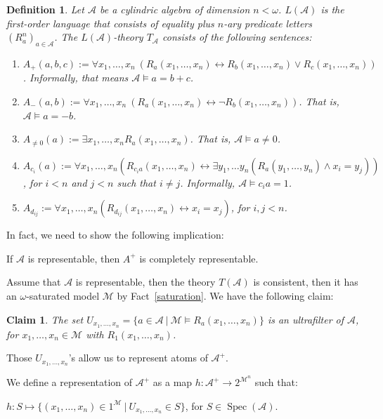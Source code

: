 \documentclass[a4paper]{article}
\theoremstyle{defin}
\newtheorem{defin}{Definition}
\theoremstyle{theorem}
\theoremstyle{claim}
\newtheorem{claim}{Claim}
\theoremstyle{prop}
\theoremstyle{lemma}
\theoremstyle{fact}
\theoremstyle{ex}
\theoremstyle{col}
\begin{document}
\begin{defin} \label{theory} Let $\mathcal{A}$ be a cylindric algebra of dimension $n < \omega$.
$L(\mathcal{A})$ is the first-order language that consists of equality plus $n$-ary predicate letters $(R^n_a)_{a \in \mathcal{A}}$. The $L(\mathcal{A})$-theory $T_{\mathcal{A}}$ consists of the following sentences:
\begin{enumerate}
\item $A_+(a,b,c) := \forall x_1, \dots, x_n \: (R_a(x_1, \dots, x_n) \leftrightarrow R_b(x_1, \dots, x_n) \lor R_c(x_1, \dots, x_n))$. Informally, that means $\mathcal{A} \models a = b + c$.
\item $A_{-}(a,b) := \forall x_1, \dots, x_n \: (R_a(x_1, \dots, x_n) \leftrightarrow \neg R_b(x_1, \dots, x_n))$. That is, $\mathcal{A} \models a = - b$.
\item $A_{\neq 0}(a) := \exists x_1, \dots, x_n R_a(x_1, \dots, x_n)$. That is, $\mathcal{A} \models a \neq 0$.
\item $A_{c_i}(a) := \forall x_1, \dots, x_n (R_{c_i a}(x_1, \dots, x_n) \leftrightarrow \exists y_1, \dots y_n (R_a(y_1, \dots, y_n) \land x_i = y_j))$, for $i < n$ and $j < n$ such that $i \neq j$. Informally, $\mathcal{A} \models {c_i} a = 1$.
\item $A_{d_{ij}} := \forall x_1, \dots, x_n (R_{d_{ij}}(x_1, \dots, x_n) \leftrightarrow x_i = x_j)$, for $i, j < n$.
\end{enumerate}
\end{defin}

In fact, we need to show the following implication:
\begin{center}
If $\mathcal{A}$ is representable, then $A^{+}$ is completely representable.
\end{center}

Assume that $\mathcal{A}$ is representable, then the theory $T(\mathcal{A})$ is consistent, then it has an $\omega$-saturated model $\mathcal{M}$ by Fact~\ref{saturation}. We have the following claim:
\begin{claim}
The set $U_{x_1,\dots,x_n} = \{ a \in \mathcal{A} \: | \: \mathcal{M} \models R_a(x_1,\dots,x_n)\}$ is an ultrafilter of $\mathcal{A}$, for $x_1,\dots,x_n \in \mathcal{M}$ with $R_{1}(x_1,\dots,x_n)$.
\end{claim}
Those $U_{x_1,\dots,x_n}$'s allow us to represent atoms of $\mathcal{A}^{+}$.

We define a representation of $\mathcal{A}^{+}$ as a map $h : \mathcal{A}^{+} \to 2^{\mathcal{M}^n}$ such that:
\begin{center}
$h : S \mapsto \{ (x_1, \dots, x_n) \in 1^{\mathcal{M}} \: | \: U_{x_1,\dots,x_n} \in S \}$, for $S \in \operatorname{Spec}(\mathcal{A})$.
\end{center}
\end{document}

